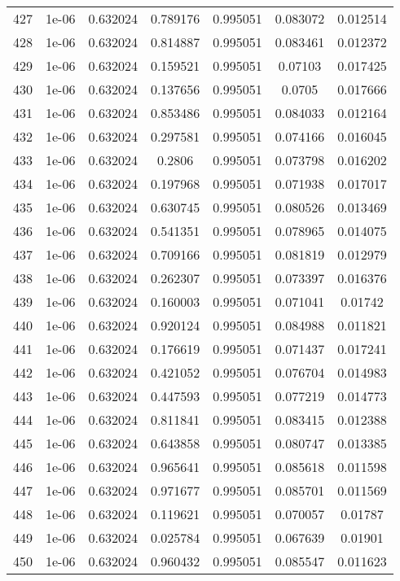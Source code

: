 \begin{table}
\begin{tabular*}{\linewidth}{c|c|c|c|c|c|c}
427 & 1e-06 & 0.632024 & 0.789176 & 0.995051 & 0.083072 & 0.012514\\
428 & 1e-06 & 0.632024 & 0.814887 & 0.995051 & 0.083461 & 0.012372\\
429 & 1e-06 & 0.632024 & 0.159521 & 0.995051 & 0.07103 & 0.017425\\
430 & 1e-06 & 0.632024 & 0.137656 & 0.995051 & 0.0705 & 0.017666\\
431 & 1e-06 & 0.632024 & 0.853486 & 0.995051 & 0.084033 & 0.012164\\
432 & 1e-06 & 0.632024 & 0.297581 & 0.995051 & 0.074166 & 0.016045\\
433 & 1e-06 & 0.632024 & 0.2806 & 0.995051 & 0.073798 & 0.016202\\
434 & 1e-06 & 0.632024 & 0.197968 & 0.995051 & 0.071938 & 0.017017\\
435 & 1e-06 & 0.632024 & 0.630745 & 0.995051 & 0.080526 & 0.013469\\
436 & 1e-06 & 0.632024 & 0.541351 & 0.995051 & 0.078965 & 0.014075\\
437 & 1e-06 & 0.632024 & 0.709166 & 0.995051 & 0.081819 & 0.012979\\
438 & 1e-06 & 0.632024 & 0.262307 & 0.995051 & 0.073397 & 0.016376\\
439 & 1e-06 & 0.632024 & 0.160003 & 0.995051 & 0.071041 & 0.01742\\
440 & 1e-06 & 0.632024 & 0.920124 & 0.995051 & 0.084988 & 0.011821\\
441 & 1e-06 & 0.632024 & 0.176619 & 0.995051 & 0.071437 & 0.017241\\
442 & 1e-06 & 0.632024 & 0.421052 & 0.995051 & 0.076704 & 0.014983\\
443 & 1e-06 & 0.632024 & 0.447593 & 0.995051 & 0.077219 & 0.014773\\
444 & 1e-06 & 0.632024 & 0.811841 & 0.995051 & 0.083415 & 0.012388\\
445 & 1e-06 & 0.632024 & 0.643858 & 0.995051 & 0.080747 & 0.013385\\
446 & 1e-06 & 0.632024 & 0.965641 & 0.995051 & 0.085618 & 0.011598\\
447 & 1e-06 & 0.632024 & 0.971677 & 0.995051 & 0.085701 & 0.011569\\
448 & 1e-06 & 0.632024 & 0.119621 & 0.995051 & 0.070057 & 0.01787\\
449 & 1e-06 & 0.632024 & 0.025784 & 0.995051 & 0.067639 & 0.01901\\
450 & 1e-06 & 0.632024 & 0.960432 & 0.995051 & 0.085547 & 0.011623\\
\end{tabular*}
\end{table}
